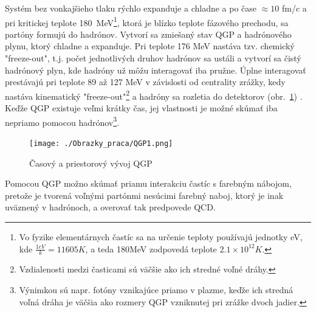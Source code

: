 \documentclass[thesismargins, thesislinespacing]{rnthesis}
\begin{document}
Systém bez vonkajšieho tlaku rýchlo expanduje a chladne a po čase $\approx 10$ fm/c a pri kritickej teplote 180~MeV\footnote{Vo fyzike elementárnych častíc sa na určenie teploty používajú jednotky eV, kde $\frac{1eV}{k}= 11605K$, a teda 180MeV zodpovedá teplote $2.1\times10^{12}K$.}, ktorá je blízko teplote fázového prechodu, sa partóny formujú do hadrónov. Vytvorí sa zmiešaný stav QGP a hadrónového plynu, ktorý chladne a expanduje.  Pri teplote 176 MeV\cite{tempr} nastáva tzv. chemický "freeze-out\-", t.j. počet jednotlivých druhov hadrónov sa ustáli a vytvorí sa čistý hadrónový plyn, kde hadróny už môžu interagovať iba pružne. Úplne interagovať prestávajú pri teplote 89 až 127 MeV v závislosti od centrality zrážky\cite{kinfrezze}, kedy nastáva kinematický "freeze-out"\footnote{Vzdialenosti medzi časticami sú väčšie ako ich stredné voľné dráhy. } \-a hadróny sa rozletia do detektorov (obr.~\ref{QGP}) . Keďže QGP existuje veľmi krátky čas, jej vlastnosti je možné skúmať iba nepriamo pomocou hadrónov\footnote{Výnimkou sú napr. fotóny vznikajúce priamo v plazme, keďže ich stredná voľná dráha je väčšia ako rozmery QGP vzniknutej pri zrážke dvoch jadier.}.  

\begin{figure}[hbtp!]
	\begin{center}
		\texttt{[image: ./Obrazky\_praca/QGP1.png]}
		\caption{ Časový a priestorový vývoj QGP \cite{vyvoj}}
		\label{QGP}
	\end{center}
\end{figure}  

Pomocou QGP možno skúmať priamu interakciu častíc s  farebným nábojom, pretože je tvorená voľnými partónmi nesúcimi farebný naboj, ktorý je inak uväznený v hadrónoch, a overovať tak predpovede QCD. 
\end{document}
